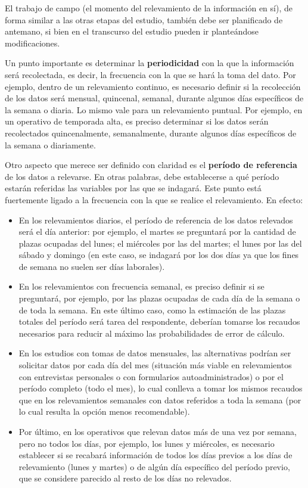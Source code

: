 \documentclass[
]{book}
\begin{document}
El trabajo de campo (el momento del relevamiento de la información en sí), de forma similar a las otras etapas del estudio, también debe ser planificado de antemano, si bien en el transcurso del estudio pueden ir planteándose modificaciones.

Un punto importante es determinar la \textbf{periodicidad} con la que la información será recolectada, es decir, la frecuencia con la que se hará la toma del dato. Por ejemplo, dentro de un relevamiento continuo, es necesario definir si la recolección de los datos será mensual, quincenal, semanal, durante algunos días específicos de la semana o diaria. Lo mismo vale para un relevamiento puntual. Por ejemplo, en un operativo de temporada alta, es preciso determinar si los datos serán recolectados quincenalmente, semanalmente, durante algunos días específicos de la semana o diariamente.

Otro aspecto que merece ser definido con claridad es el \textbf{período de referencia} de los datos a relevarse. En otras palabras, debe establecerse a qué período estarán referidas las variables por las que se indagará. Este punto está fuertemente ligado a la frecuencia con la que se realice el relevamiento. En efecto:

\begin{itemize}
\item
  En los relevamientos diarios, el período de referencia de los datos relevados será el día anterior: por ejemplo, el martes se preguntará por la cantidad de plazas ocupadas del lunes; el miércoles por las del martes; el lunes por las del sábado y domingo (en este caso, se indagará por los dos días ya que los fines de semana no suelen ser días laborales).
\item
  En los relevamientos con frecuencia semanal, es preciso definir si se preguntará, por ejemplo, por las plazas ocupadas de cada día de la semana o de toda la semana. En este último caso, como la estimación de las plazas totales del período será tarea del respondente, deberían tomarse los recaudos necesarios para reducir al máximo las probabilidades de error de cálculo.
\item
  En los estudios con tomas de datos mensuales, las alternativas podrían ser solicitar datos por cada día del mes (situación más viable en relevamientos con entrevistas personales o con formularios autoadministrados) o por el período completo (todo el mes), lo cual conlleva a tomar los mismos recaudos que en los relevamientos semanales con datos referidos a toda la semana (por lo cual resulta la opción menos recomendable).
\item
  Por último, en los operativos que relevan datos más de una vez por semana, pero no todos los días, por ejemplo, los lunes y miércoles, es necesario establecer si se recabará información de todos los días previos a los días de relevamiento (lunes y martes) o de algún día específico del período previo, que se considere parecido al resto de los días no relevados.
\end{itemize}
\end{document}
